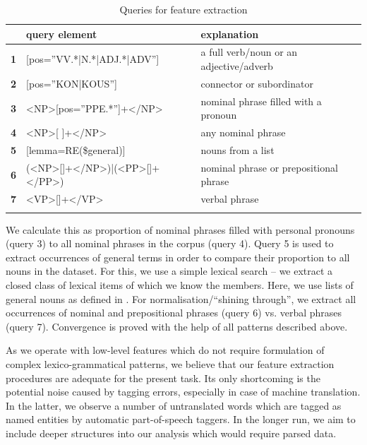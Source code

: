 \documentclass[output=paper]{LSP/langsci}
\begin{document}
\begin{table}
     \centering
     \begin{tabular}{lll}
\lsptoprule
              & \textbf{query element}         & \textbf{explanation} \\ \midrule
\textbf{1}    & [pos=”VV.*|N.*|ADJ.*|ADV”]     & a full verb/noun or an adjective/adverb \\
\textbf{2}    & [pos=”KON|KOUS”]               & connector or subordinator \\
\textbf{3}    & <NP>[pos=”PPE.*”]+</NP>		   & nominal phrase filled with a pronoun \\
\textbf{4}    & <NP>[ ]+</NP>             & any nominal phrase \\ 
\textbf{5}    & [lemma=RE(\$general)]     & nouns from a list   \\ 
\textbf{6}    & (<NP>[]+</NP>)|(<PP>[]+</PP>) & nominal phrase or prepositional phrase \\
\textbf{7}    & <VP>[]+</VP> & verbal phrase\\
\lspbottomrule
     \end{tabular}

 \caption{Queries for feature extraction}
     \label{tab:4.1}
\end{table}

We calculate this as proportion of nominal phrases filled with personal pronouns (query 3) to all nominal phrases in the corpus (query 4). Query 5 is used to extract occurrences of general terms in order to compare their proportion to all nouns in the dataset. For this, we use a simple lexical search – we extract a closed class of lexical items of which we know the members. Here, we use lists of general nouns as defined in \citep{Dipper2012}. For normalisation/“shining through”, we extract all occurrences of nominal and prepositional phrases (query 6) vs. verbal phrases (query 7). Convergence is proved with the help of all patterns described above.

As we operate with low-level features which do not require formulation of complex lexico-grammatical patterns, we believe that our feature extraction procedures are adequate for the present task.  Its only shortcoming is the potential noise caused by tagging errors, especially in case of machine translation. In the latter, we observe a number of untranslated words which are tagged as named entities by automatic part-of-speech taggers.  In the longer run, we aim to include deeper structures into our analysis which would require parsed data.
\end{document}
